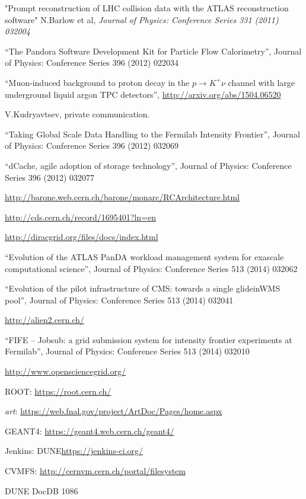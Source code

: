 \begin{thebibliography}{99}
 "Prompt reconstruction of LHC collision data with the ATLAS reconstruction software" N.Barlow et al, \textit{Journal of Physics: Conference Series 331 (2011) 032004}

 ``The Pandora Software Development Kit for Particle Flow Calorimetry'', Journal of Physics: Conference Series 396 (2012) 022034

 ``Muon-induced background to proton decay in the $p \rightarrow K^+\nu$ channel with large underground liquid argon TPC detectors'', \url{http://arxiv.org/abs/1504.06520}

 V.Kudryavtsev, private communication.

 ``Taking Global Scale Data Handling to the Fermilab Intensity Frontier'', Journal of Physics: Conference Series 396 (2012) 032069

 ``dCache, agile adoption of storage technology'', Journal of Physics: Conference Series 396 (2012) 032077

 \url{http://barone.web.cern.ch/barone/monarc/RCArchitecture.html}

 \url{http://cds.cern.ch/record/1695401?ln=en}

 \url{http://diracgrid.org/files/docs/index.html}

 ``Evolution of the ATLAS PanDA workload management system for exascale computational science'', Journal of Physics: Conference Series 513 (2014) 032062

 ``Evolution of the pilot infrastructure of CMS: towards a single glideinWMS pool'',  Journal of Physics: Conference Series 513 (2014) 032041

 \url{http://alien2.cern.ch/}

 ``FIFE -- Jobsub: a grid submission system for intensity frontier experiments at Fermilab'',  Journal of Physics: Conference Series 513 (2014) 032010

 \url{http://www.opensciencegrid.org/}

 ROOT: \url{https://root.cern.ch/}

 \textit{art}: \url{https://web.fnal.gov/project/ArtDoc/Pages/home.aspx}

 GEANT4: \url{https://geant4.web.cern.ch/geant4/}

 Jenkins: DUNE\url{https://jenkins-ci.org/}

 CVMFS: \url{http://cernvm.cern.ch/portal/filesystem}

 DUNE DocDB 1086 %

\end{thebibliography}
